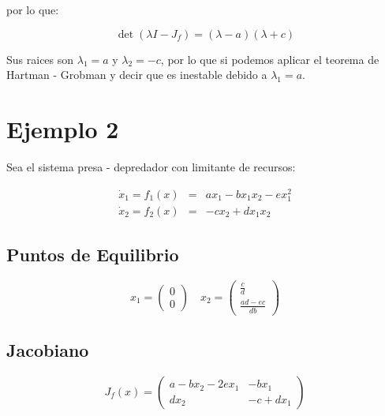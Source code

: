             por lo que:

            \begin{equation*}
                \det{(\lambda I - J_f)} = \left( \lambda - a \right) \left( \lambda + c \right)
            \end{equation*}

            Sus raices son $\lambda_1 = a$ y $\lambda_2 = -c$, por lo que si podemos aplicar el teorema de Hartman - Grobman y decir que es inestable debido a $\lambda_1 = a$.

    \section{Ejemplo 2}

        Sea el sistema presa - depredador con limitante de recursos:

        \begin{eqnarray*}
            \dot{x}_1 = f_1(x) & = & a x_1 - b x_1 x_2 - e x_1^2 \\
            \dot{x}_2 = f_2(x) & = & -c x_2 + d x_1 x_2
        \end{eqnarray*}

        \subsection{Puntos de Equilibrio}

        \begin{equation*}
            x_1 =
            \begin{pmatrix}
                0 \\
                0
            \end{pmatrix} \quad
            x_2 =
            \begin{pmatrix}
                \frac{c}{d} \\
                \frac{ad - ec}{db}
            \end{pmatrix}
        \end{equation*}

        \subsection{Jacobiano}

            \begin{equation*}
                J_f(x) =
                \begin{pmatrix}
                    a - b x_2 - 2 e x_1 & - b x_1 \\
                    d x_2 & - c + d x_1
                \end{pmatrix}
            \end{equation*}

